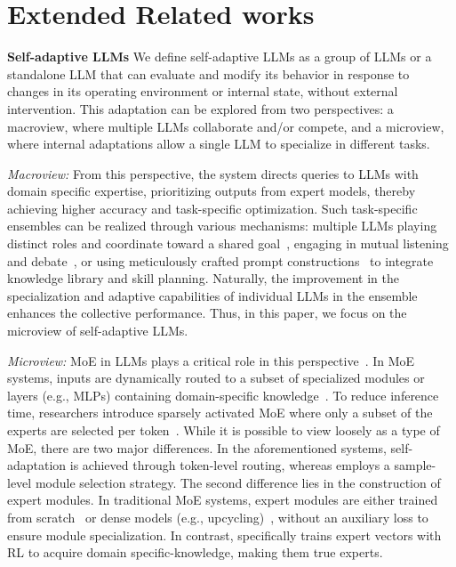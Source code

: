 
\newpage
\section{Extended Related works}
\label{app:sec:extendedrelatedworks}


\textbf{Self-adaptive LLMs} We define self-adaptive LLMs as a group of LLMs or a standalone LLM that can evaluate and modify its behavior in response to changes in its operating environment or internal state, without external intervention.
This adaptation can be explored from two perspectives: a macroview, where multiple LLMs collaborate and/or compete, and a microview, where internal adaptations allow a single LLM to specialize in different tasks.

\textit{Macroview:} From this perspective, the system directs queries to LLMs with domain specific expertise, prioritizing outputs from expert models, thereby achieving higher accuracy and task-specific optimization.
Such task-specific ensembles can be realized through various mechanisms: multiple LLMs playing distinct roles and coordinate toward a shared goal~\citep{zhuge2023mindstorms}, engaging in mutual listening and debate~\citep{du2023improving}, or using meticulously crafted prompt constructions~\citep{zhang2024proagent} to integrate knowledge library and skill planning.
Naturally, the improvement in the specialization and adaptive capabilities of individual LLMs in the ensemble enhances the collective performance.
Thus, in this paper, we focus on the microview of self-adaptive LLMs.

\textit{Microview:} MoE in LLMs plays a critical role in this perspective~\citep{ICML2024_MoE}.
In MoE systems, inputs are dynamically routed to a subset of specialized modules or layers (e.g., MLPs) containing domain-specific knowledge~\citep{rajbhandari2022deepspeed,fedus2022switch}.
To reduce inference time, researchers introduce sparsely activated MoE where only a subset of the experts are selected per token~\cite{jiang2024mixtral,qwen_team_2024}.
While it is possible to view \implname loosely as a type of MoE, there are two major differences.
In the aforementioned systems, self-adaptation is achieved through token-level routing, whereas \implname employs a sample-level module selection strategy.
The second difference lies in the construction of expert modules.
In traditional MoE systems, expert modules are either trained from scratch~\citep{fedus2022switch,jiang2024mixtral} or dense models (e.g., upcycling)~\citep{qwen_team_2024,zhu2024llama}, without an auxiliary loss to ensure module specialization.
In contrast, \implname specifically trains expert vectors with RL to acquire domain specific-knowledge, making them true experts.


